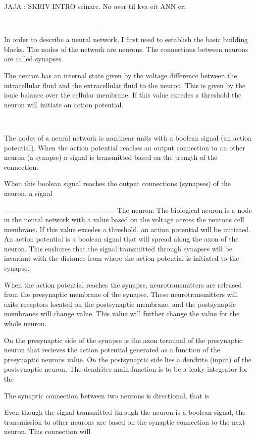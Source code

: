 JAJA : SKRIV INTRO seinare. No over til kva eit ANN er:

-------------------------------------------

In order to describe a neural network, I first need to establish the basic building blocks. The nodes of the network are neurons. The connections between neurons are called synapses.

The neuron has an internal state given by the voltage difference between the intracellular fluid and the extracellular fluid to the neuron. This is given by the ionic balance over the cellular membrane. 
If this value excedes a threshold the neuron will initiate an action potential.  

------------------------


The nodes of a neural network is nonlinear units with a boolean signal (an action potential). 
When the action potential reaches an output connection to an other neuron (a synapse) a signal is transmitted based on the trength of the connection. 

When this boolean signal reaches the output connections (synapses) of the neuron, a signal 


------------------------------------------------
The neuron:
The biological neuron is a node in the neural network with a value based on the voltage across the neurons cell membrane. If this value excedes a threshold, an action potential will be initiated. 
An action potential is a boolean signal that will spread along the axon of the neuron. 
This enshures that the signal transmitted through synapses will be invariant with the distance from where the action potential is initiated to the synapse.

When the action potential reaches the synapse, neurotransmitters are released from the presynaptic membrane of the synapse. 
These neurotransmitters will exite receptors located on the postsynaptic membrane, and the postsynaptic membranes will change value. This value will further change the value for the whole neuron.

On the presynaptic side of the synapse is the axon terminal of the presynaptic neuron that recieves the action potential generated as a function of the presynaptic neurons value. 
On the postsynaptic side lies a dendrite (input) of the postsynaptic neuron. The dendrites main function is to be a leaky integrator for the 

The synaptic connection between two neurons is directional, that is

Even though the signal transmitted through the neuron is a boolean signal, the transmission to other neurons are based on the synaptic connection to the next neuron. This connection will 


